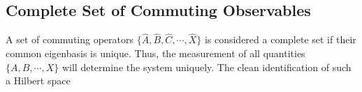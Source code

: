 \subsection{Complete Set of Commuting Observables}

A set of commuting operators $\{\hat{A},\hat{B},\hat{C},\cdots,\hat{X}\}$ is considered a complete set if their common eigenbasis is 				unique. Thus, the measurement of all quantities $\{A,B,\cdots,X\}$ will determine the system uniquely. The clean identification of such a Hilbert space 